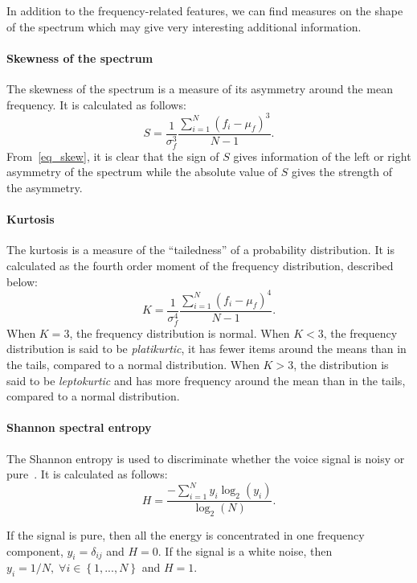 In addition to the frequency-related features, we can find measures on the shape of the spectrum which may give very interesting additional information. 
\paragraph{Skewness of the spectrum}
The skewness of the spectrum is a measure of its asymmetry around the mean frequency. It is calculated as follows:
\begin{equation}
\label{eq_skew}
	S = \frac{1}{\sigma_f^3}\frac{\sum\limits_{i=1}^{N} \left(f_i - \mu_f\right)^3}{N-1}.
\end{equation}
From~\eqref{eq_skew}, it is clear that the sign of $S$ gives information of the left or right asymmetry of the spectrum while the absolute value of $S$ gives the strength of the asymmetry. 
\paragraph{Kurtosis}
The kurtosis is a measure of the ``tailedness'' of a probability distribution. It is calculated as the fourth order moment of the frequency distribution, described below:
\begin{equation}
\label{eq_kurtosis}
	K = \frac{1}{\sigma_f^4}\frac{\sum\limits_{i=1}^{N} \left(f_i - \mu_f\right)^4}{N-1}.
\end{equation}
When $K=3$, the frequency distribution is normal. When $K<3$, the frequency distribution is said to be \textit{platikurtic}, it has fewer items around the means than in the tails, compared to a normal distribution. When $K>3$, the distribution is said to be \textit{leptokurtic} and has more frequency around the mean than in the tails, compared to a normal distribution.
\paragraph{Shannon spectral entropy}
The Shannon entropy is used to discriminate whether the voice signal is noisy or pure~\cite{Nunes2004}. It is calculated as follows:
\begin{equation}
\label{eq:entropy}
	H = \frac{-\sum\limits_{i=1}^{N} y_i \log_2 \left(y_i\right)}{\log_2 \left(N\right)}.
\end{equation}

If the signal is pure, then all the energy is concentrated in one frequency component, \ie{} $y_i = \delta_{ij}$ and $H=0$. If the signal is a white noise, then $y_i = 1/N, \; \forall i \in \left\lbrace 1,...,N \right\rbrace$ and $H=1$.
